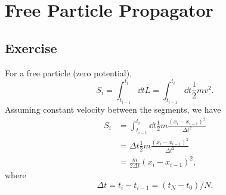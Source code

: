 \section{Free Particle Propagator}
\subsection{Exercise}
For a free particle (zero potential),
\begin{equation}
    S_i=\int_{t_{i-1}}^{t_i} \dd t L= \int_{t_{i-1}}^{t_i} \dd t \frac 1 2 mv^2.
\end{equation}
Assuming constant velocity between the segments, we have
\begin{align}
    S_i &=\int_{t_{i-1}}^{t_i} \dd t \frac 1 2 m \frac{(x_i-x_{i-1})^2}{\Delta t^2} \\
&=\Delta t\frac 1 2 m \frac{(x_i-x_{i-1})^2}{\Delta t^2} \\
&= \frac{m}{2\Delta t}(x_i-x_{i-1})^2,
\end{align}
where 
\begin{equation}
    \Delta t=t_{i}-t_{i-1}=(t_N-t_0)/N.
\end{equation}
